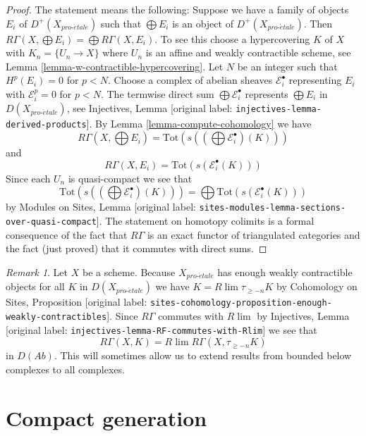 \documentclass[10pt,a4paper]{article}
\theoremstyle{plain}
\theoremstyle{definition}
\theoremstyle{remark}
\newtheorem{remark}[subsection]{Remark}
\numberwithin{equation}{subsection}
\def\lim{\mathop{\mathrm{lim}}\nolimits}
\def\proetale{{pro\text{-}\acute{e}tale}}
\begin{document}
\begin{proof}
The statement means the following: Suppose we have a family of objects
$E_i$ of $D^+(X_\proetale)$ such that $\bigoplus E_i$ is an object
of $D^+(X_\proetale)$. Then
$R\Gamma(X, \bigoplus E_i) = \bigoplus R\Gamma(X, E_i)$.
To see this choose a hypercovering $K$ of $X$ with $K_n = \{U_n \to X\}$
where $U_n$ is an affine and weakly contractible scheme, see
Lemma \ref{lemma-w-contractible-hypercovering}.
Let $N$ be an integer such that $H^p(E_i) = 0$ for $p < N$.
Choose a complex of abelian sheaves $\mathcal{E}_i^\bullet$
representing $E_i$ with $\mathcal{E}_i^p = 0$ for $p < N$.
The termwise direct sum $\bigoplus \mathcal{E}_i^\bullet$ represents
$\bigoplus E_i$ in $D(X_\proetale)$, see
Injectives, Lemma \textnormal{[original label: \nolinkurl{injectives-lemma-derived-products}]}.
By Lemma \ref{lemma-compute-cohomology} we have
$$
R\Gamma(X, \bigoplus E_i) =
\text{Tot}(s((\bigoplus \mathcal{E}^\bullet_i)(K)))
$$
and
$$
R\Gamma(X, E_i) = \text{Tot}(s(\mathcal{E}^\bullet_i(K)))
$$
Since each $U_n$ is quasi-compact we see that
$$
\text{Tot}(s((\bigoplus \mathcal{E}^\bullet_i)(K))) =
\bigoplus \text{Tot}(s(\mathcal{E}^\bullet_i(K)))
$$
by Modules on Sites, Lemma
\textnormal{[original label: \nolinkurl{sites-modules-lemma-sections-over-quasi-compact}]}.
The statement on homotopy colimits is a formal consequence of the fact
that $R\Gamma$ is an exact functor of triangulated categories and the
fact (just proved) that it commutes with direct sums.
\end{proof}

\begin{remark}
\label{remark-extend-to-all}
Let $X$ be a scheme. Because $X_\proetale$ has enough weakly contractible
objects for all $K$ in $D(X_\proetale)$ we have $K = R\lim \tau_{\geq -n}K$
by
Cohomology on Sites, Proposition
\textnormal{[original label: \nolinkurl{sites-cohomology-proposition-enough-weakly-contractibles}]}.
Since $R\Gamma$ commutes with $R\lim$ by
Injectives, Lemma \textnormal{[original label: \nolinkurl{injectives-lemma-RF-commutes-with-Rlim}]}
we see that
$$
R\Gamma(X, K) = R\lim R\Gamma(X, \tau_{\geq -n}K)
$$
in $D(\textit{Ab})$. This will sometimes allow us to extend results from
bounded below complexes to all complexes.
\end{remark}







\section{Compact generation}
\label{section-compact-generation}
\end{document}
